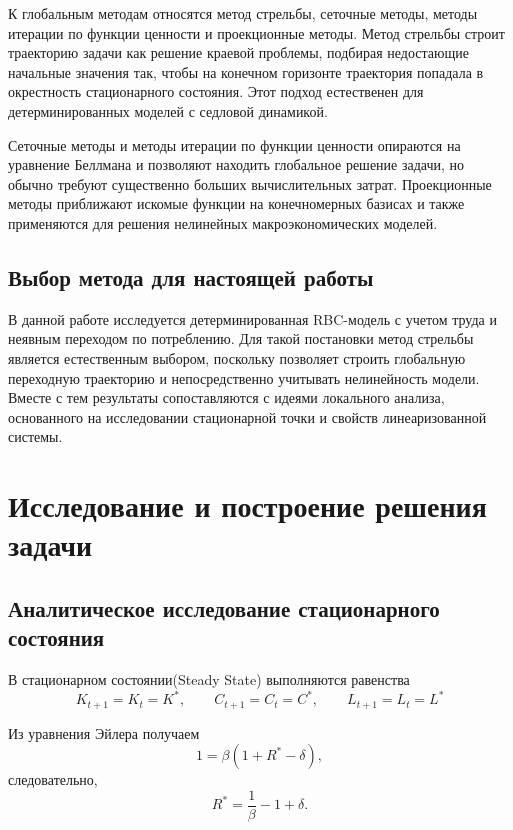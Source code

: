 \documentclass[14pt,a4paper]{extreport}
\begin{document}
    К глобальным методам относятся метод стрельбы, сеточные методы, методы итерации по функции ценности и проекционные методы. Метод стрельбы строит траекторию задачи как решение краевой проблемы, подбирая недостающие начальные значения так, чтобы на конечном горизонте траектория попадала в окрестность стационарного состояния. Этот подход естественен для детерминированных моделей с седловой динамикой.

    Сеточные методы и методы итерации по функции ценности опираются на уравнение Беллмана и позволяют находить глобальное решение задачи, но обычно требуют существенно больших вычислительных затрат. Проекционные методы приближают искомые функции на конечномерных базисах и также применяются для решения нелинейных макроэкономических моделей.

    \section{Выбор метода для настоящей работы}

    В данной работе исследуется детерминированная RBC-модель с учетом труда и неявным переходом по потреблению. Для такой постановки метод стрельбы является естественным выбором, поскольку позволяет строить глобальную переходную траекторию и непосредственно учитывать нелинейность модели. Вместе с тем результаты сопоставляются с идеями локального анализа, основанного на исследовании стационарной точки и свойств линеаризованной системы.

\chapter{Исследование и построение решения задачи}
    \section{Аналитическое исследование стационарного состояния}

    В стационарном состоянии(Steady State) выполняются равенства
    \begin{equation}
    K_{t+1}=K_t=K^*, \qquad
    C_{t+1}=C_t=C^*, \qquad
    L_{t+1}=L_t=L^*
    \end{equation}

    Из уравнения Эйлера получаем
    \begin{equation}
    1=\beta(1+R^*-\delta),
    \end{equation}
    следовательно,
    \begin{equation}
    R^*=\frac{1}{\beta}-1+\delta.
    \end{equation}
\end{document}
